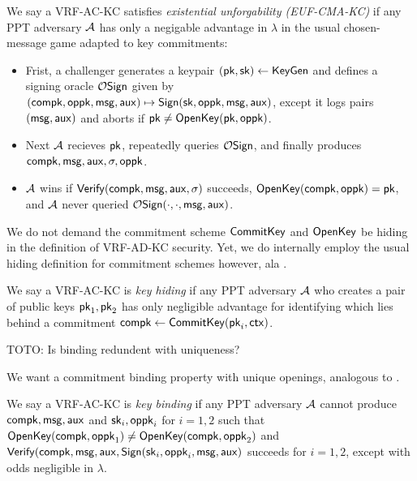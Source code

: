 \begin{definition}
We say a VRF-AC-KC satisfies {\em existential unforgability (EUF-CMA-KC)} if
any PPT adversary $\mathcal{A}$ has only a negigable advantage in $\lambda$
in the usual chosen-message game adapted to key commitments:
\begin{itemize}
 \item Frist, a challenger
  generates a keypair $(\mathsf{pk},\mathsf{sk}) \leftarrow {\ensuremath{\mathsf{KeyGen}}}$ and
  defines a signing oracle $\mathcal{O}\mathsf{Sign}$ given by
  $(\mathsf{compk},\mathsf{oppk},\mathsf{msg},\mathsf{aux}) \mapsto {\ensuremath{\mathsf{Sign}}}(\mathsf{sk},\mathsf{oppk},\mathsf{msg},\mathsf{aux})$,
   except it logs pairs $(\mathsf{msg},\mathsf{aux})$ and aborts if $\mathsf{pk} \ne {\ensuremath{\mathsf{OpenKey}}}(\mathsf{pk},\mathsf{oppk})$.
 \item Next $\mathcal{A}$ recieves $\mathsf{pk}$, repeatedly queries $\mathcal{O}\mathsf{Sign}$,
  and finally produces $\mathsf{compk},\mathsf{msg},\mathsf{aux},\sigma,\mathsf{oppk}$.
 \item $\mathcal{A}$ wins if ${\mathsf{Verify}}(\mathsf{compk},\mathsf{msg},\mathsf{aux},\sigma)$ succeeds,
  ${\mathsf{OpenKey}}(\mathsf{compk},\mathsf{oppk}) = \mathsf{pk}$, and
   $\mathcal{A}$ never queried $\mathcal{O}\mathsf{Sign}(\cdot,\cdot,\mathsf{msg},\mathsf{aux})$.
\end{itemize}
\end{definition}

We do not demand the commitment scheme ${\mathsf{CommitKey}}$ and ${\mathsf{OpenKey}}$
be hiding in the definition of VRF-AD-KC security.
Yet, we do internally employ the usual hiding definition for
 commitment schemes however, ala \cite[pp.8]{cryptoeprint:2019:1185}.

\begin{definition}
We say a VRF-AC-KC is {\em key hiding} if any PPT adversary $\mathcal{A}$
who creates a pair of public keys $\mathsf{pk}_1,\mathsf{pk}_2$
has only negligible advantage for identifying which lies behind a commitment
 $\mathsf{compk} \leftarrow {\ensuremath{\mathsf{CommitKey}}}(\mathsf{pk}_i,\mathsf{ctx})$.
\end{definition}

TOTO: Is binding redundent with uniqueness?

We want a commitment binding property with unique openings,
analogous to \cite[pp.9]{cryptoeprint:2019:1185}.

\begin{definition}
We say a VRF-AC-KC is {\em key binding} if any PPT adversary $\mathcal{A}$
cannot produce $\mathsf{compk},\mathsf{msg},\mathsf{aux}$ and $\mathsf{sk}_i,\mathsf{oppk}_i$ for $i=1,2$
such that
 ${\mathsf{OpenKey}}(\mathsf{compk},\mathsf{oppk}_1) \ne {\ensuremath{\mathsf{OpenKey}}}(\mathsf{compk},\mathsf{oppk}_2)$ and
 ${\mathsf{Verify}}(\mathsf{compk},\mathsf{msg},\mathsf{aux},{\mathsf{Sign}}(\mathsf{sk}_i,\mathsf{oppk}_i,\mathsf{msg},\mathsf{aux})$ succeeds for $i=1,2$,
except with odds negligible in $\lambda$.
\end{definition}

